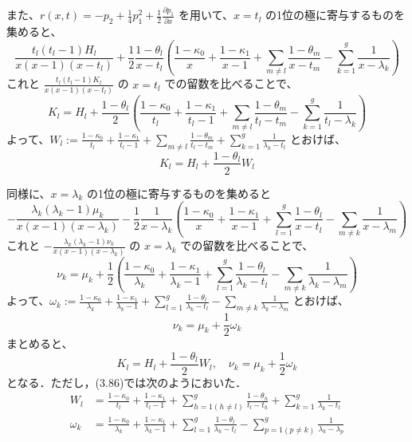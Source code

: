 \begin{story}
また、$r(x,t) = -p_2 + \frac{1}{4}p_1^2 + \frac{1}{2}\frac{\partial p_1}{\partial x}$
を用いて、$x=t_l$ の1位の極に寄与するものを集めると、
\begin{equation*}
    \frac{t_l(t_l-1)H_l}{x(x-1)(x-t_l)} + \frac{1}{2} \frac{1-\theta_l}{x-t_l} \left( \frac{1-\kappa_0}{x} + \frac{1-\kappa_1}{x-1} + \sum_{m \neq l} \frac{1-\theta_m}{x-t_m} - \sum_{k=1}^g \frac{1}{x-\lambda_k} \right)
\end{equation*}
これと $\frac{t_l(t_l-1)K_l}{x(x-1)(x-t_l)}$ の $x=t_l$ での留数を比べることで、
\begin{equation*}
    K_l = H_l + \frac{1-\theta_l}{2} \left( \frac{1-\kappa_0}{t_l} + \frac{1-\kappa_1}{t_l-1} + \sum_{m \neq l} \frac{1-\theta_m}{t_l-t_m} - \sum_{k=1}^g \frac{1}{t_l-\lambda_k} \right)
\end{equation*}
よって、$W_l := \frac{1-\kappa_0}{t_l} + \frac{1-\kappa_1}{t_l-1} + \sum_{m \neq l} \frac{1-\theta_m}{t_l-t_m} + \sum_{k=1}^g \frac{1}{\lambda_k-t_l}$ とおけば、
\begin{equation*}
    K_l = H_l + \frac{1-\theta_l}{2} W_l
\end{equation*}

同様に、$x=\lambda_k$ の1位の極に寄与するものを集めると
\begin{equation*}
    -\frac{\lambda_k(\lambda_k-1)\mu_k}{x(x-1)(x-\lambda_k)} - \frac{1}{2} \frac{1}{x-\lambda_k} \left( \frac{1-\kappa_0}{x} + \frac{1-\kappa_1}{x-1} + \sum_{l=1}^g \frac{1-\theta_l}{x-t_l} - \sum_{m \neq k} \frac{1}{x-\lambda_m} \right)
\end{equation*}
これと $-\frac{\lambda_k(\lambda_k-1)\nu_k}{x(x-1)(x-\lambda_k)}$ の $x=\lambda_k$ での留数を比べることで、
\begin{equation*}
    \nu_k = \mu_k + \frac{1}{2} \left( \frac{1-\kappa_0}{\lambda_k} + \frac{1-\kappa_1}{\lambda_k-1} + \sum_{l=1}^g \frac{1-\theta_l}{\lambda_k-t_l} - \sum_{m \neq k} \frac{1}{\lambda_k-\lambda_m} \right)
\end{equation*}
よって、$\omega_k := \frac{1-\kappa_0}{\lambda_k} + \frac{1-\kappa_1}{\lambda_k-1} + \sum_{l=1}^g \frac{1-\theta_l}{\lambda_k-t_l} - \sum_{m \neq k} \frac{1}{\lambda_k-\lambda_m}$ とおけば、
\begin{equation*}
    \nu_k = \mu_k + \frac{1}{2} \omega_k
\end{equation*}
まとめると、
\begin{equation}
    K_l = H_l + \frac{1-\theta_l}{2} W_l, \quad \nu_k = \mu_k + \frac{1}{2} \omega_k \label{eq:3.86}
\end{equation}
となる．ただし，(3.86)では次のようにおいた．
\begin{align*}
    W_l &= \frac{1-\kappa_0}{t_l} + \frac{1-\kappa_1}{t_l-1} + \sum_{h=1 (h\neq l)}^g \frac{1-\theta_h}{t_l-t_h} + \sum_{k=1}^g \frac{1}{\lambda_k-t_l} \\
    \omega_k &= \frac{1-\kappa_0}{\lambda_k} + \frac{1-\kappa_1}{\lambda_k-1} + \sum_{l=1}^g \frac{1-\theta_l}{\lambda_k-t_l} - \sum_{p=1 (p\neq k)}^g \frac{1}{\lambda_k-\lambda_p}
\end{align*}


\end{story}
